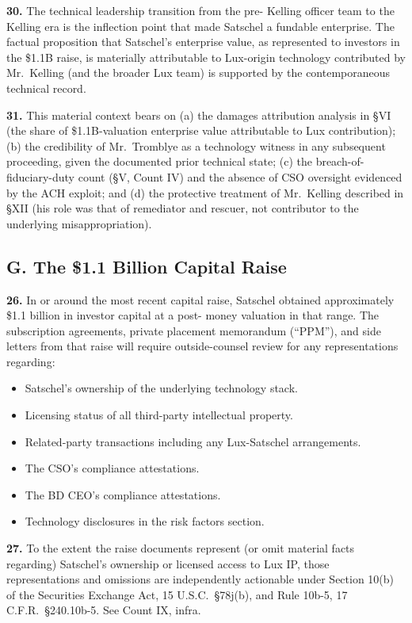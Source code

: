 \documentclass[11pt,letterpaper]{article}
\begin{document}
\textbf{30.} The technical leadership transition from the pre-
Kelling officer team to the Kelling era is the inflection point that
made Satschel a fundable enterprise. The factual proposition that
Satschel's enterprise value, as represented to investors in the
\$1.1B raise, is materially attributable to Lux-origin technology
contributed by Mr.\ Kelling (and the broader Lux team) is supported
by the contemporaneous technical record.

\textbf{31.} This material context bears on (a) the damages
attribution analysis in \S VI (the share of \$1.1B-valuation
enterprise value attributable to Lux contribution); (b) the
credibility of Mr.\ Tromblye as a technology witness in any
subsequent proceeding, given the documented prior technical state;
(c) the breach-of-fiduciary-duty count (\S V, Count IV) and the
absence of CSO oversight evidenced by the ACH exploit; and (d) the
protective treatment of Mr.\ Kelling described in \S XII (his role
was that of remediator and rescuer, not contributor to the
underlying misappropriation).

\subsection*{G. The \$1.1 Billion Capital Raise}

\textbf{26.} In or around the most recent capital raise, Satschel
obtained approximately \$1.1 billion in investor capital at a post-
money valuation in that range. The subscription agreements, private
placement memorandum (``PPM''), and side letters from that raise will
require outside-counsel review for any representations regarding:

\begin{itemize}[leftmargin=2em,itemsep=0.1em]
\item Satschel's ownership of the underlying technology stack.
\item Licensing status of all third-party intellectual property.
\item Related-party transactions including any Lux-Satschel
arrangements.
\item The CSO's compliance attestations.
\item The BD CEO's compliance attestations.
\item Technology disclosures in the risk factors section.
\end{itemize}

\textbf{27.} To the extent the raise documents represent (or omit
material facts regarding) Satschel's ownership or licensed access to
Lux IP, those representations and omissions are independently
actionable under Section 10(b) of the Securities Exchange Act, 15
U.S.C.\ \S 78j(b), and Rule 10b-5, 17 C.F.R.\ \S 240.10b-5. See
Count IX, infra.
\end{document}

